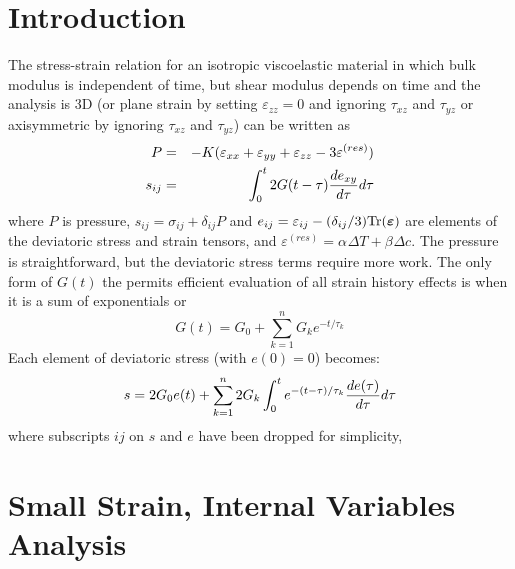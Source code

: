 \documentclass[11pt]{book}
\newcommand{\tens}[1]{\boldsymbol{\mathsf{#1}}}
\def\a#1{\alpha_{#1}}
\def\b#1{\beta_{#1}}
\def\DT{\Delta T}
\def\e#1{\varepsilon_{#1}}
\def\er#1{\varepsilon_{#1}^{(res)}}
\def\t#1{\tau_{#1}}
\begin{document}
\section{Introduction}

The stress-strain relation for an isotropic viscoelastic material in which bulk modulus is independent of time, but shear modulus depends on time and the analysis is 3D (or plane strain by setting $\e{zz}=0$ and ignoring $\t{xz}$ and $\t{yz}$ or axisymmetric by ignoring $\t{xz}$ and $\t{yz}$) can be written as
\begin{eqnarray}
      P & = & -K(\e{xx} + \e{yy} + \e{zz} - 3\er{})  \\
      s_{ij} & = & \int_0^t 2G(t-\tau) {de_{xy}\over d\tau} d\tau
\end{eqnarray}
where $P$ is pressure, $s_{ij} = \sigma_{ij}+\delta_{ij}P$ and $e_{ij} = \varepsilon_{ij} - (\delta_{ij}/3){\rm Tr}( \tens\varepsilon)$ are elements of the deviatoric stress and strain tensors, and $\er{} = \a{}\DT + \b{}\Delta c$.
The pressure is straightforward, but the deviatoric stress terms require more work. The only form of $G(t)$ the permits efficient evaluation of all strain history effects is when it is a sum of exponentials or
\begin{equation}
        G(t) = G_0 + \sum_{k=1}^n G_k e^{-t/\tau_k}
\end{equation}
Each element of deviatoric stress (with $e(0)=0$) becomes:
\begin{equation}
     s = 2G_0 e(t) + \sum_{k=1}^n 2 G_k \int_0^t e^{-(t-\tau)/\tau_k} {de(\tau)\over d\tau} d\tau
\end{equation}
where subscripts $ij$ on $s$ and $e$ have been dropped for simplicity,

\section{Small Strain, Internal Variables Analysis}
\end{document}
